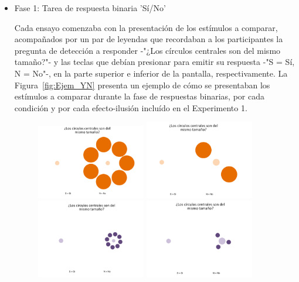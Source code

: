 \begin{itemize}
\item Fase 1: Tarea de respuesta binaria 'Sí/No'

Cada ensayo comenzaba con la presentación de los estímulos a comparar, acompañados por un par de leyendas que recordaban a los participantes la pregunta de detección a responder -"¿Los círculos centrales son del mismo tamaño?"- y las teclas que debían presionar para emitir su respuesta -"S = Sí, N = No"-, en la parte superior e inferior de la pantalla, respectivamente. La Figura~\ref{fig:Ejem_YN} presenta un ejemplo de cómo se presentaban los estímulos a comparar durante la fase de respuestas binarias, por cada condición y por cada efecto-ilusión incluído en el Experimento 1.\\

\begin{figure}[th]
\centering
\includegraphics[width=0.45\textwidth]{Figures/Ejemplo_EnsayoYN_1} \includegraphics[width=0.45\textwidth]{Figures/Ejemplo_EnsayoYN_2}
\includegraphics[width=0.45\textwidth]{Figures/Ejemplo_EnsayoYN_4} \includegraphics[width=0.45\textwidth]{Figures/Ejemplo_EnsayoYN_3}

\end{figure}
\end{itemize}
